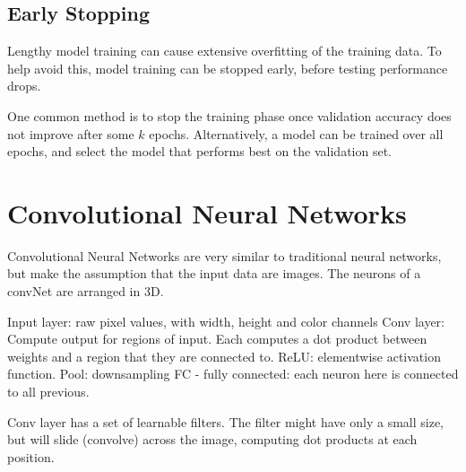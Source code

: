 \subsection{Early Stopping}\label{nnets-earlystop}

Lengthy model training can cause extensive overfitting of the training data. To help avoid this, model training can be stopped early, before testing performance drops.

One common method is to stop the training phase once validation accuracy does not improve after some $k$ epochs. Alternatively, a model can be trained over all epochs, and select the model that performs best on the validation set.

\section{Convolutional Neural Networks}\label{convNeuralNets}

Convolutional Neural Networks are very similar to traditional neural networks, but make the assumption that the input data are images.
The neurons of a convNet are arranged in 3D. 

Input layer: raw pixel values, with width, height and color channels
Conv layer: Compute output for regions of input. Each computes a dot product between weights and a region that they are connected to.
ReLU: elementwise activation function.
Pool: downsampling
FC - fully connected: each neuron here is connected to all previous.

Conv layer has a set of learnable filters. The filter might have only a small size, but will slide (convolve) across the image, computing dot products at each position.


%
%
%
%


